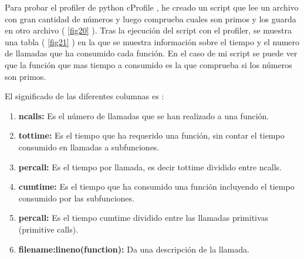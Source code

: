 Para probar el profiler de python cProfile \cite{cprofile}, he creado un script que lee un archivo con gran cantidad de números y luego comprueba cuales son primos y los guarda en otro archivo ( \cref{fig20} ). Tras la ejecución del script con el profiler, se muestra una tabla ( \cref{fig21} ) en la que se muestra información sobre el tiempo y el numero de llamadas que ha consumido cada función. En el caso de mi script se puede ver que la función que mas tiempo a consumido es la que comprueba si los números son primos.
\newline

El significado de las diferentes columnas es \cite{cprofile}:
\begin{enumerate}
  \item \textbf{ncalls:} Es el número de llamadas que se han realizado a una función.
  \item \textbf{tottime:} Es el tiempo que ha requerido una función, sin contar el tiempo consumido en llamadas a subfunciones.
  \item \textbf{percall:} Es el tiempo por llamada, es decir tottime dividido entre ncalls.
  \item \textbf{cumtime:} Es el tiempo que ha consumido una función incluyendo el tiempo consumido por las subfunciones.
  \item \textbf{percall:} Es el tiempo cumtime dividido entre las llamadas primitivas (primitive calls).
  \item \textbf{filename:lineno(function):} Da una descripción de la llamada.
\end{enumerate}


